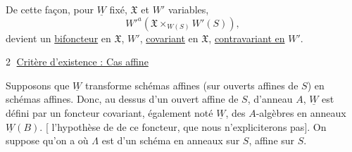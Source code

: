 De cette façon, pour $\underline W$ fixé,   $\mathfrak X$ et $W'$ variables,
\[
W'^a(\mathfrak X\times_{W(S)}W'(S)),
\]
devient un \uline{bifoncteur} en $\mathfrak X$, $W'$, \uline{covariant} en $\mathfrak X$, \uline{contravariant en} $W'$.

\textcircled{2} \uline{Critère d'existence : Cas affine}

Supposons que $\underline W$ transforme schémas affines (sur ouverts affines de $S$) en schémas affines. Donc, au dessus d'un ouvert affine de $S$, d'anneau $A$, $\underline W$ est défini par un foncteur covariant, également noté $\underline W$, des  $A$-algèbres  en anneaux $\underline W(B)$. [ l'hypothèse de   de ce foncteur, que nous n'expliciterons pas]. On suppose qu'on a
où $\Lambda$ est   d'un schéma en anneaux  sur $S$, affine sur $S$.
